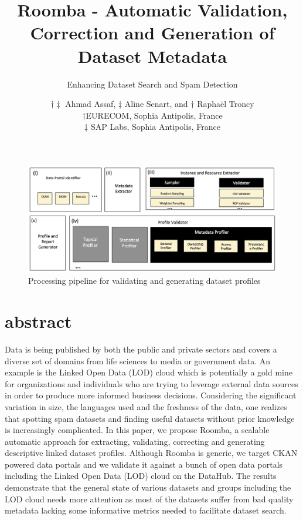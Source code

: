 \documentclass{sig-alternate}
\begin{document}

\title{Roomba - Automatic Validation, Correction and Generation of Dataset Metadata}
\subtitle{Enhancing Dataset Search and Spam Detection}

\author{\alignauthor $\dagger\ddagger$ Ahmad Assaf, $\ddagger$ Aline Senart, and $\dagger$ Rapha\"{e}l Troncy \\
\affaddr$\dagger${EURECOM, Sophia Antipolis, France} \\ \affaddr$\ddagger${ SAP Labs, Sophia Antipolis, France} \\
}

\maketitle
\begin{figure}[t!]
  \centering
    \includegraphics[scale=0.4]{figure-1_architecture.png}
  \caption{Processing pipeline for validating and generating dataset profiles}
  \label{fig:1}
\end{figure}

\section{abstract}
Data is being published by both the public and private sectors and covers a diverse set of domains from life sciences to media or government data. An example is the Linked Open Data (LOD) cloud which is potentially a gold mine for organizations and individuals who are trying to leverage external data sources in order to produce more informed business decisions. Considering the significant variation in size, the languages used and the freshness of the data, one realizes that spotting spam datasets and finding useful datasets without prior knowledge is increasingly complicated. In this paper, we propose Roomba, a scalable automatic approach for extracting, validating, correcting and generating descriptive linked dataset profiles. Although Roomba is generic, we target CKAN powered data portals and we validate it against a bunch of open data portals including the Linked Open Data (LOD) cloud on the DataHub. The results demonstrate that the general state of various datasets and groups including the LOD cloud needs more attention as most of the datasets suffer from bad quality metadata lacking some informative metrics needed to facilitate dataset search.
\end{document}
